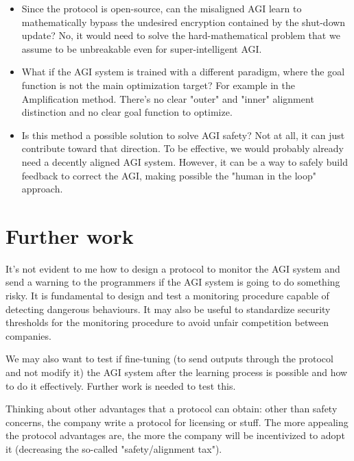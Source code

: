 \documentclass{article}
\begin{document}
\begin{itemize}
    \item Since the protocol is open-source, can the misaligned AGI learn to mathematically bypass the undesired encryption contained by the shut-down update?
     No, it would need to solve the hard-mathematical problem that we assume to be unbreakable even for super-intelligent AGI.
    
     \item What if the AGI system is trained with a different paradigm, where the goal function is not the main optimization target? For example in the Amplification method. There's no clear "outer" and "inner" alignment distinction and no clear goal function to optimize. 

    \item Is this method a possible solution to solve AGI safety? Not at all, it can just contribute toward that direction. To be effective, we would probably already need a decently aligned AGI system. However, it can be a way to safely build feedback to correct the AGI, making possible the "human in the loop" approach.
    \end{itemize}
    
\section{Further work}
It's not evident to me how to design a protocol to monitor the AGI system and send a warning to the programmers if the AGI system is going to do something risky. 
It is fundamental to design and test a monitoring procedure capable of detecting dangerous behaviours.
It may also be useful to standardize security thresholds for the monitoring procedure to avoid unfair competition between companies.

We may also want to test if fine-tuning (to send outputs through the protocol and not modify it) the AGI system after the learning process is possible and how to do it effectively. Further work is needed to test this.

Thinking about other advantages that a protocol can obtain: other than safety concerns, the company write a protocol for licensing or stuff. 
The more appealing the protocol advantages are, the more the company will be incentivized to adopt it (decreasing the so-called "safety/alignment tax").
\end{document}
